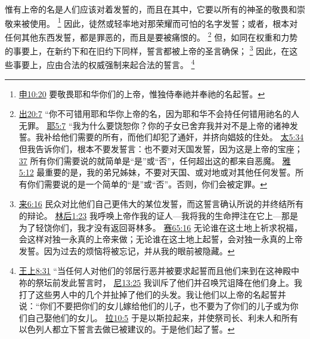 \documentclass[12pt, a4paper, oneside]{ctexart}
\newcounter{parnum}[section]
\newcommand{\N}{%
   \noindent\refstepcounter{parnum}%
    \makebox[\parindent][l]{\textbf{\arabic{parnum}.}}}
\begin{document}
\N 惟有上帝的名是人们应该对着发誓的，而且在其中，它要以所有的神圣的敬畏和崇敬来被使用。
	\footnote {
		\href{https://biblehub.com/deuteronomy/10-20.htm}{申10:20} 要敬畏耶和华你们的上帝，惟独侍奉祂并奉祂的名起誓。
	}
	因此，徒然或轻率地对那荣耀而可怕的名字发誓；或者，根本对任何其他东西发誓，都是罪恶的，而且是要被痛恨的。
	\footnote {
		\href{https://biblehub.com/exodus/20-7.htm}{出20:7} “你不可错用耶和华你上帝的名，因为耶和华不会持任何错用祂名的人无罪。
		\href{https://biblehub.com/jeremiah/5-7.htm}{耶5:7} “我为什么要饶恕你？你的子女已舍弃我并对不是上帝的诸神发誓。我补给他们需要的所有，而他们却犯了通奸，并挤向娼妓的住处。
		\href{https://biblehub.com/matthew/5-34.htm}{太5:34} 但我告诉你们，根本不要发誓言：也不要对天国发誓，因为这是上帝的宝座；
		\href{https://biblehub.com/matthew/5-37.htm}{37} 所有你们需要说的就简单是“是”或“否”，任何超出这的都来自恶魔。
		\href{https://biblehub.com/james/5-12.htm}{雅5:12} 最重要的是，我的弟兄姊妹，不要对天国、或对地或对其他任何发誓。所有你们需要说的是一个简单的“是”或“否”。否则，你们会被定罪。
	}
	但，如同在权重和力势的事要上，在新约下和在旧约下同样，誓言都被上帝的圣言确保；
	\footnote {
		\href{https://biblehub.com/hebrews/6-16.htm}{来6:16} 民众对比他们自己更伟大的某位发誓，而这誓言确认所说的并终结所有的辩论。
		\href{https://biblehub.com/2_corinthians/1-23.htm}{林后1:23} 我呼唤上帝作我的证人---我将我的生命押注在它上---那是为了轻饶你们，我才没有返回哥林多。
		\href{https://biblehub.com/isaiah/65-16.htm}{赛65:16} 无论谁在这土地上祈求祝福，会这样对独一永真的上帝来做；无论谁在这土地上起誓，会对独一永真的上帝发誓。因为过去的烦恼将被忘记，并从我的眼前被隐藏。
	}
	因此，在这些事要上，应由合法的权威强制来起合法的誓言。
	\footnote {
		\href{https://biblehub.com/1_kings/8-31.htm}{王上8:31} “当任何人对他们的邻居行恶并被要求起誓而且他们来到在这神殿中祢的祭坛前发此誓言时，
		\href{https://biblehub.com/nehemiah/13-25.htm}{尼13:25} 我训斥了他们并召唤咒诅降在他们身上。我打了这些男人中的几个并扯掉了他们的头发。我让他们以上帝的名起誓并说：“你们不要把你们的女儿嫁给他们的儿子，也不要为了你们的儿子或为你们自己娶他们的女儿。
		\href{https://biblehub.com/ezra/10-5.htm}{拉10:5} 于是以斯拉起来，并使祭司长、利未人和所有以色列人都立下誓言去做已被建议的。于是他们起了誓。
	}
\end{document}
